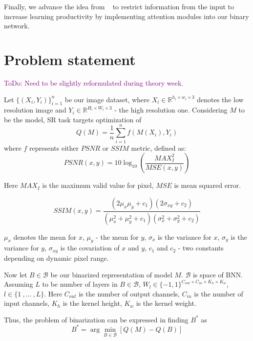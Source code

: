 \documentclass{article}
\newcommand{\TODO}[1]{\textcolor{purple}{ToDo: #1.}}
\begin{document}
Finally, we advance the idea from ~\cite{xue2022ir2net} to restrict information from the input to increase learning productivity by implementing attention modules into our binary network.

\section{Problem statement}
\label{sec:headings}

\TODO{Need to be slightly reformulated during theory week}

Let $\{(X_i, Y_i)\}_{i=1}^n$ be our image dataset, where $X_i \in \mathbb{R}^{h_i \times w_i \times 3}$ denotes the low resolution image and $Y_i \in \mathbb{R}^{H_i \times W_i \times 3}$ - the high resolution one. Considering $M$ to be the model, SR task targets optimization of 
\begin{equation}
    Q(M) = \frac{1}{n}\sum\limits_{i=1}^nf(M(X_i), Y_i)
\end{equation}
where $f$ represents either $PSNR$ or $SSIM$ metric, defined as:
\begin{equation}
    PSNR(x, y) = 10 \log_{10} \left(\frac{MAX_I^2}{MSE(x, y)}\right)
\end{equation}


Here $MAX_I$ is the maximum valid value for pixel, $MSE$ is mean squared error.

\begin{equation}
    SSIM(x, y) = \frac{(2\mu_x\mu_y + c_1)(2\sigma_{xy} + c_2)}{(\mu_x^2 + \mu_y^2 + c_1)(\sigma_{x}^2 + \sigma_{y}^2 + c_2)}
\end{equation}

$\mu_x$ denotes the mean for $x$, $\mu_y$ - the mean for $y$, $\sigma_x$ is the variance for $x$, $\sigma_y$ is the variance for $y$, $\sigma_{xy}$ is the covariation of $x$ and $y$, $c_1$ and $c_2$ - two constants depending on dynamic pixel range.

Now let $B \in \mathcal{B}$ be our binarized representation of model $M$. $\mathcal{B}$ is space of BNN. Assuming $L$ to be number of layers in $B \in \mathcal{B}$, $W_l \in \{-1, 1\}^{C_{out} \times C_{in} \times K_h \times K_w}$, $l \in \{1 \ , ... \ , L\}$. Here $C_{out}$ is the number of output channels, $C_{in}$ is the number of input channels, $K_h$ is the kernel height, $K_w$ is the kernel weight. 


Thus, the problem of binarization can be expressed in finding $B^{*}$ as
\begin{equation}
    B^{*} = \arg\min\limits_{B \in \mathcal{B}} \left[Q(M) - Q(B)\right]
\end{equation}




\end{document}
